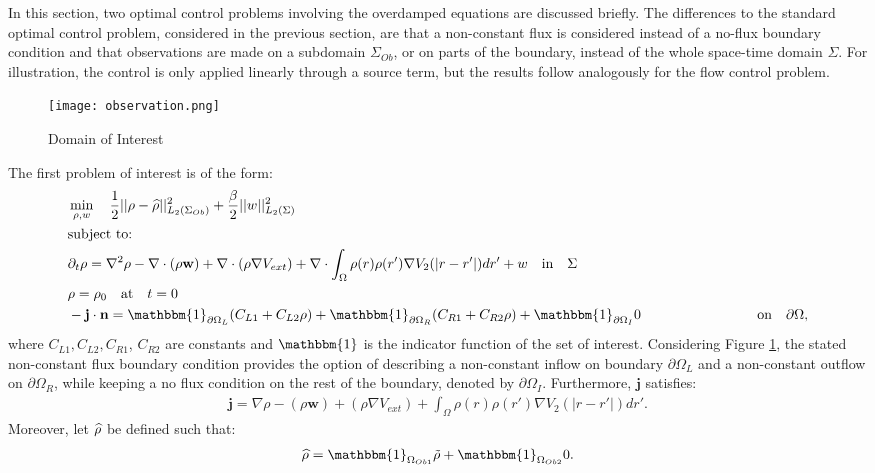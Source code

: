 

In this section, two optimal control problems involving the overdamped equations are discussed briefly. The differences to the standard optimal control problem, considered in the previous section, are that a non-constant flux is considered instead of a no-flux boundary condition and that observations are made on a subdomain $\Sigma_{Ob}$, or on parts of the boundary, instead of the whole space-time domain $\Sigma$. For illustration, the control is only applied linearly through a source term, but the results follow analogously for the flow control problem. 
\begin{figure}[h]
	\texttt{[image: observation.png]}
	\caption{Domain of Interest}
	\label{Observation1}
\end{figure}
The first problem of interest is of the form:
\begin{align*}
&\min_{\Sta, w} \quad \frac{1}{2}|| \Sta -\widehat \Sta||^2_{L_2( \Sigma_{Ob})} + \frac{\beta}{2}||w||^2_{L_2(\Sigma)}\\
&\text{subject to:}\\
&\partial_t \rho = \nabla^2 \rho - \nabla \cdot (\rho \mathbf{w}) +\nabla \cdot (\rho \nabla V_{ext}) + \nabla \cdot \int_\Omega \rho(r) \rho(r') \nabla V_2(|r-r'|) dr' + w \quad  \text{in} \quad \Sigma\notag\\
& \rho = \rho_0 \quad \text{at} \quad t=0 \notag\\
& - \mathbf{j} \cdot \nor = \mathbbm{1}_{\partial \Omega_L}( C_{L1}  + C_{L2}\Sta) +\mathbbm{1}_{\partial \Omega_R} ( C_{R1}  + C_{R2}\Sta) +\mathbbm{1}_{\partial \Omega_I} 0 \ \quad \quad\qquad\qquad  \qquad \text{on} \quad \partial \Omega, 
\end{align*}
where $C_{L1}, C_{L2}, C_{R1}$, $C_{R2}$ are constants and $\mathbbm{1}$ is the indicator function of the set of interest. Considering Figure \ref{Observation1}, the stated non-constant flux boundary condition provides the option of describing a non-constant inflow on boundary $\partial \Omega_L$ and a non-constant outflow on $\partial \Omega_R$, while keeping a no flux condition on the rest of the boundary, denoted by $\partial \Omega_I$.
Furthermore, $\mathbf{j}$ satisfies:
\begin{align*}
\mathbf{j}=\nabla \rho - (\rho \mathbf{w}) +(\rho \nabla V_{ext}) +  \int_\Omega \rho(r) \rho(r') \nabla V_2(|r-r'|) dr'.
\end{align*}
Moreover, let $\widehat {\rho}$ be defined such that:
\begin{align*}
\widehat \Sta = \mathbbm{1}_{ \Omega_{Ob1}} \tilde \Sta  +\mathbbm{1}_{ \Omega_{Ob2}} 0.
\end{align*}
